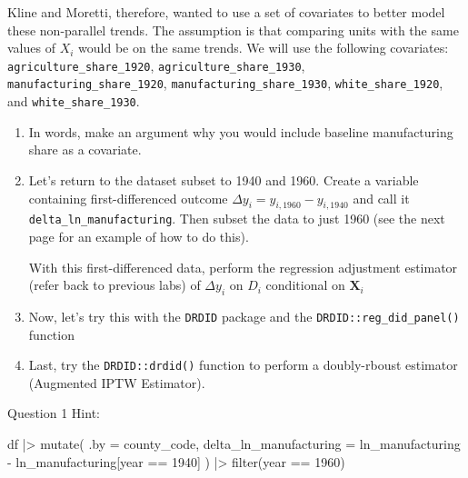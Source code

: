 \documentclass[12pt]{article}
\begin{document}
Kline and Moretti, therefore, wanted to use a set of covariates to better model these non-parallel trends. 
The assumption is that comparing units with the same values of $X_i$ would be on the same trends.
We will use the following covariates: \texttt{agriculture\_share\_1920}, \texttt{agriculture\_share\_1930}, \texttt{manufacturing\_share\_1920}, \texttt{manufacturing\_share\_1930}, \newline \texttt{white\_share\_1920}, and \texttt{white\_share\_1930}.


\begin{enumerate}
  \item In words, make an argument why you would include baseline manufacturing share as a covariate. 

  \item Let's return to the dataset subset to 1940 and 1960. 
  Create a variable containing first-differenced outcome $\Delta y_i = y_{i,1960} - y_{i,1940}$ and call it \texttt{delta\_ln\_manufacturing}.
  Then subset the data to just 1960 (see the next page for an example of how to do this).
  
  With this first-differenced data, perform the regression adjustment estimator (refer back to previous labs) of $\Delta y_i$ on $D_i$ conditional on $\bm{X}_i$

  \item Now, let's try this with the \texttt{DRDID} package and the \texttt{DRDID::reg\_did\_panel()} function
  
  \item Last, try the \texttt{DRDID::drdid()} function to perform a doubly-rboust estimator (Augmented IPTW Estimator).
\end{enumerate}


\newpage
Question 1 Hint: 
\begin{codeblock}
df |> 
  mutate(
    .by = county_code, 
    delta_ln_manufacturing = 
      ln_manufacturing - ln_manufacturing[year == 1940]
  ) |> 
  filter(year == 1960)
\end{codeblock} 
\end{document}
